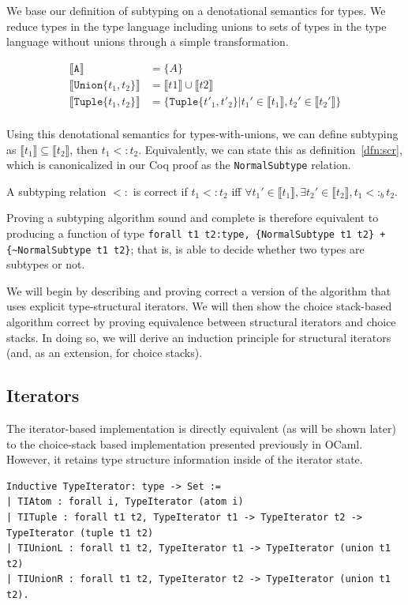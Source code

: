 \documentclass[a4paper,english]{lipics-v2019}
\newcommand{\xt}[1]{\texttt{#1}}
\newcommand{\tuplet}[2]{\xt{Tuple\{}#1,#2\xt{\}}}
\newcommand{\union}[2]{\xt{Union\{}#1,#2\xt{\}}}
\newcommand{\denotes}[1]{\llbracket #1 \rrbracket}
\newcommand{\bsub}{<:_b}
\begin{document}
We base our definition of subtyping on a denotational semantics for types. 
We reduce types in the type language including unions to sets of types
in the type language without unions through a simple transformation. 

\begin{align*}
\denotes{\xt{A}} &= \{A\} \\
\denotes{\union{t_1}{t_2}} &= \denotes{t1} \cup \denotes{t2} \\
\denotes{\tuplet{t_1}{t_2}} &= \{\tuplet{t'_1}{t'_2} | t_1' \in \denotes{t_1},  t_2' \in \denotes{t_2'}\} \\
\end{align*}

Using this denotational semantics for types-with-unions, we can define
subtyping as $\denotes{t_1} \subseteq \denotes{t_2}$, then $t_1 <: t_2$.
Equivalently, we can state this as definition~\ref{dfn:scr}, which is canonicalized
in our Coq proof as the \verb|NormalSubtype| relation.

\begin{definition}
A subtyping relation $<:$ is correct if $t_1 <: t_2$ iff $\forall t_1' \in \denotes{t_1},
\exists t_2' \in \denotes{t_2}, t_1 \bsub t_2$.
\label{dfn:scr}
\end{definition}

Proving a subtyping algorithm sound and complete is therefore equivalent to
producing a function of type \verb|forall t1 t2:type, {NormalSubtype t1 t2} + {~NormalSubtype t1 t2}|; that is, is able to decide whether two types are
subtypes or not.

We will begin by describing and proving correct a version of the algorithm
that uses explicit type-structural iterators. We will then show the choice
stack-based algorithm correct by proving equivalence between structural
iterators and choice stacks. In doing so, we will derive an induction
principle for structural iterators (and, as an extension, for choice stacks).

\subsection{Iterators}

The iterator-based implementation is directly equivalent (as will be shown
later) to the choice-stack based implementation presented previously in OCaml.
However, it retains type structure information inside of the iterator state.

\begin{small}\begin{verbatim}
Inductive TypeIterator: type -> Set :=
| TIAtom : forall i, TypeIterator (atom i)
| TITuple : forall t1 t2, TypeIterator t1 -> TypeIterator t2 -> TypeIterator (tuple t1 t2)
| TIUnionL : forall t1 t2, TypeIterator t1 -> TypeIterator (union t1 t2)
| TIUnionR : forall t1 t2, TypeIterator t2 -> TypeIterator (union t1 t2).
\end{verbatim}\end{small}
\end{document}
